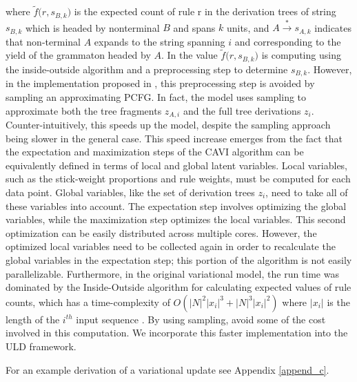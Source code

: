 \documentclass[12pt,letterpaper]{article}
\begin{document}
where $\tilde f \Big(r, s_{B,k}\Big)$ is the expected count of rule r in the derivation trees of string $s_{B,k}$ which is headed by nonterminal $B$ and spans $k$ units, and $A \overset{*}{\rightarrow} s_{A,k}$ indicates that non-terminal $A$ expands to the string spanning $i$ and corresponding to the yield of the grammaton headed by $A$. In \citet{cohen:2010} the value $\tilde f \Big(r, s_{B,k}\Big)$ is computing using the inside-outside algorithm and a preprocessing step to determine $s_{B,k}$. However, in the implementation proposed in \citet{zhai:2014}, this preprocessing step is avoided by sampling an approximating PCFG. In fact, the \citet{zhai:2014} model uses sampling to approximate both the tree fragments $z_{A,i}$ and the full tree derivations $z_i$. Counter-intuitively, this speeds up the model, despite the sampling approach being slower in the general case. This speed increase emerges from the fact that the expectation and maximization steps of the CAVI algorithm can be equivalently defined in terms of local and global latent variables. Local variables, such as the stick-weight proportions and rule weights, must be computed for each data point. Global variables, like the set of derivation trees $z_i$, need to take all of these variables into account. The expectation step involves optimizing the global variables, while the maximization step optimizes the local variables. This second optimization can be easily distributed across multiple cores. However, the optimized local variables need to be collected again in order to recalculate the global variables in the expectation step; this portion of the algorithm is not easily parallelizable. Furthermore, in the original variational model, the run time was dominated by the Inside-Outside algorithm for calculating expected values of rule counts, which has a time-complexity of $O(|N|^2 |x_i|^3 + |N|^3|x_i|^2)$ where $|x_i|$ is the length of the $i^{th}$ input sequence \citep{cohen:2010}. By using sampling, \citet{zhai:2014} avoid some of the cost involved in this computation. We incorporate this faster implementation into the ULD framework.

 For an example derivation of a variational update see Appendix \ref{append_c}. 
\end{document}
